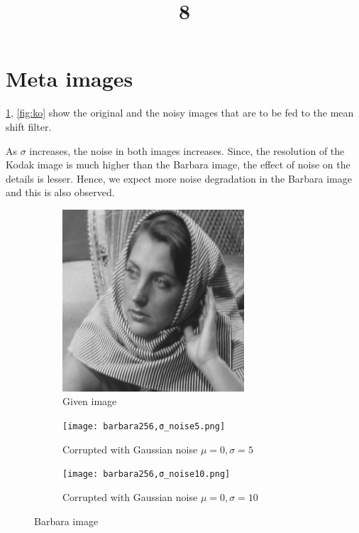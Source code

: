 \documentclass[a4paper, landscape]{article}
\title{8}
\date{}
\begin{document}
\maketitle
\section{Meta images}
\ref{fig:bo}, \ref{fig:ko} show the original and the noisy images that are to be fed to  the mean shift filter.

As $\sigma$ increases, the noise in both images increases. 
Since, the resolution of the Kodak image is much higher than the Barbara image, the effect of noise on the details is lesser. Hence, we expect more noise degradation in the Barbara image and this is also observed.
\begin{figure}
    \centering
    \begin{subfigure}{0.33\linewidth}
        \centering
        \includegraphics[width=\linewidth]{barbara256.png}
        \caption{Given image}
    \end{subfigure}
    \begin{subfigure}{0.33\linewidth}
        \centering
        \texttt{[image: barbara256,σ\_noise5.png]}
        \caption{Corrupted with Gaussian noise $\mu=0, \sigma=5$}
    \end{subfigure}
    \begin{subfigure}{0.33\linewidth}
        \centering
        \texttt{[image: barbara256,σ\_noise10.png]}
        \caption{Corrupted with Gaussian noise $\mu=0, \sigma=10$}
    \end{subfigure}
    \caption{Barbara image}
    \label{fig:bo}
\end{figure}
\end{document}
